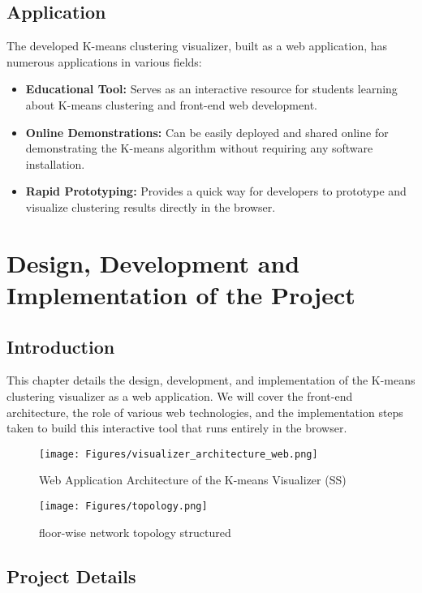 \documentclass[12pt]{report}
\begin{document}
\section{Application}
The developed K-means clustering visualizer, built as a web application, has numerous applications in various fields:
\begin{itemize}
    \item \textbf{Educational Tool:} Serves as an interactive resource for students learning about K-means clustering and front-end web development.
    \item \textbf{Online Demonstrations:} Can be easily deployed and shared online for demonstrating the K-means algorithm without requiring any software installation.
    \item \textbf{Rapid Prototyping:} Provides a quick way for developers to prototype and visualize clustering results directly in the browser.
\end{itemize}


\newpage
\chapter{Design, Development and Implementation of the Project}

\section{Introduction}
This chapter details the design, development, and implementation of the K-means clustering visualizer as a web application. We will cover the front-end architecture, the role of various web technologies, and the implementation steps taken to build this interactive tool that runs entirely in the browser.
\begin{figure}[h]
        \centering
        \texttt{[image: Figures/visualizer\_architecture\_web.png]}
        \caption{Web Application Architecture of the K-means Visualizer (SS)}
\end{figure}
\begin{figure}[h]
        \centering
        \texttt{[image: Figures/topology.png]}
        \caption{floor-wise network topology structured}
\end{figure}
\section{Project Details}
\end{document}
